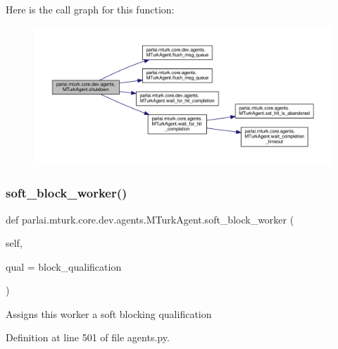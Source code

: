 Here is the call graph for this function\+:
\nopagebreak
\begin{figure}[H]
\begin{center}
\leavevmode
\includegraphics[width=350pt]{classparlai_1_1mturk_1_1core_1_1dev_1_1agents_1_1MTurkAgent_a2b0576f33db15042a1520f6c9b4157c2_cgraph}
\end{center}
\end{figure}
\mbox{\label{classparlai_1_1mturk_1_1core_1_1dev_1_1agents_1_1MTurkAgent_ad256094580f1dd63071a31cfe5c4ba98}} 
\subsubsection{\texorpdfstring{soft\+\_\+block\+\_\+worker()}{soft\_block\_worker()}}
{\footnotesize\ttfamily def parlai.\+mturk.\+core.\+dev.\+agents.\+M\+Turk\+Agent.\+soft\+\_\+block\+\_\+worker (\begin{DoxyParamCaption}\item[{}]{self,  }\item[{}]{qual = {\ttfamily \textquotesingle{}block\+\_\+qualification\textquotesingle{}} }\end{DoxyParamCaption})}

\begin{DoxyVerb}Assigns this worker a soft blocking qualification\end{DoxyVerb}
 

Definition at line 501 of file agents.\+py.



